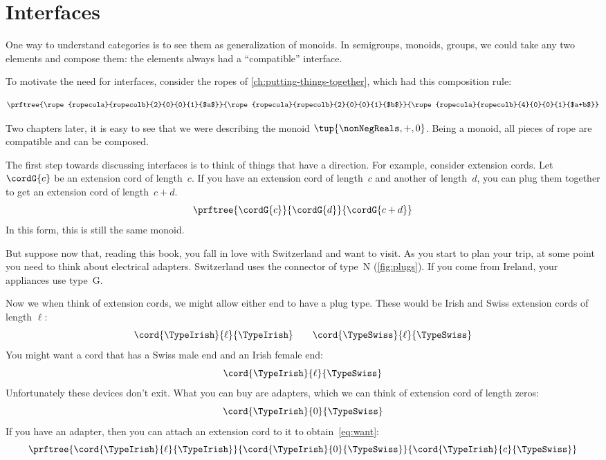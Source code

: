 
\section{Interfaces}

One way to understand categories is to see them as generalization of monoids. 
In semigroups, monoids, groups, we could take any two elements and compose them: the elements always had a ``compatible'' interface. 

To motivate the need for interfaces, consider the ropes of \cref{ch:putting-things-together},
which had this composition rule:

\begin{equation*}
\prftree{\rope{ropecola}{ropecolb}{2}{0}{0}{1}{$a$}}
{\rope{ropecola}{ropecolb}{2}{0}{0}{1}{$b$}}
{\rope{ropecola}{ropecolb}{4}{0}{0}{1}{$a+b$}}
\end{equation*}

Two chapters later, it is easy to see that we were describing the monoid $\tup{\nonNegReals, +, 0}$.
Being a monoid, all pieces of rope are compatible and can be composed.

The first step towards discussing interfaces is to think of things that have a direction. 
For example, consider extension cords. Let~$\cordG{c}$ be an extension cord of length~$c$.
If you have an extension cord of length~$c$ and another of length~$d$, you can plug them together to get an extension cord of length~$c+d$.
% 
\begin{equation}
  \label{eq:cords}
  \prftree{\cordG{c}}{\cordG{d}}{\cordG{c+d}}
\end{equation}
% 
In this form, this is still the same monoid. 

But suppose now that, reading this book, you fall in love with Switzerland and want to visit. 
As you start to plan your trip, at some point you need to think about electrical adapters.
 Switzerland uses the connector of type~N (\cref{fig:plugs}).
If you come from Ireland, your appliances use type~G.

Now we when think of extension cords, we might allow either end to have a plug type. 
% 
These would be Irish and Swiss  extension cords of length $\ell$:
% 
\begin{equation}
  \cord{\TypeIrish}{\ell}{\TypeIrish} \qquad \cord{\TypeSwiss}{\ell}{\TypeSwiss}
\end{equation}
% 
You might want a cord that has a Swiss male end and an Irish female end:
% 
\begin{equation}\label{eq:want}
  \cord{\TypeIrish}{\ell}{\TypeSwiss}
\end{equation}
% 
Unfortunately these devices don't exit. 
What you can buy are adapters, which we can think of extension cord of length zeros:
\begin{equation}
  \cord{\TypeIrish}{0}{\TypeSwiss}
\end{equation}
% 
If you have an adapter, then you can attach an extension cord to it to obtain~\cref{eq:want}:
% 
\begin{equation}
  \label{eq:irish-swiss-result}
  \prftree{\cord{\TypeIrish}{\ell}{\TypeIrish}}{\cord{\TypeIrish}{0}{\TypeSwiss}}{\cord{\TypeIrish}{c}{\TypeSwiss}}
\end{equation}

